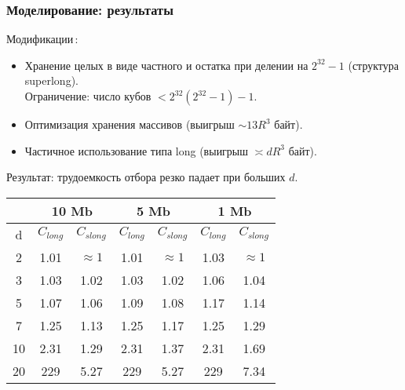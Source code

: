 \documentclass[pdf, intlimits, 14pt, unicode]{beamer} %
\begin{document}
\begin{frame}
    \frametitle{Моделирование: результаты}
    \alert{Модификации\,:}\,
    \begin{itemize}
        \item Хранение целых в виде частного и остатка при делении на
        $2^{32}-1$ (структура superlong).\\ Ограничение: число кубов
        $<2^{32}(2^{32}-1)-1$.
        \item Оптимизация хранения массивов (выигрыш $\sim 13R^3$
        байт).
        \item Частичное использование типа long (выигрыш $\asymp dR^3$
        байт).
    \end{itemize}

    \alert{Результат:} трудоемкость отбора резко падает при больших
    $d$.

    \begin{center}
        \begin{tabular}{|c||c|c||c|c||c|c|}
            \hline
            &  \multicolumn{2}{c||}{10 Mb}&  \multicolumn{2}{c||}{5 Mb}&  \multicolumn{2}{c|}{1 Mb}  \\\hline
            d&$C_{long}$&$C_{slong}$&$C_{long}$&$C_{slong}$&$C_{long}$&$C_{slong}$\\ \hline
            2& 1.01& $\approx1$ &1.01& $\approx1$&1.03 & $\approx1$  \\ \hline
            3& 1.03& 1.02&1.03&1.02&1.06&1.04\\ \hline
            5& 1.07&1.06&1.09&1.08&1.17&1.14\\\hline
            7&1.25&1.13&1.25& 1.17&1.25&1.29\\\hline
            10&2.31&1.29  &2.31&1.37&2.31&1.69\\\hline
            20&229&5.27  &229&5.27&229&7.34\\\hline
        \end{tabular}
    \end{center}
\end{frame}
\end{document}
